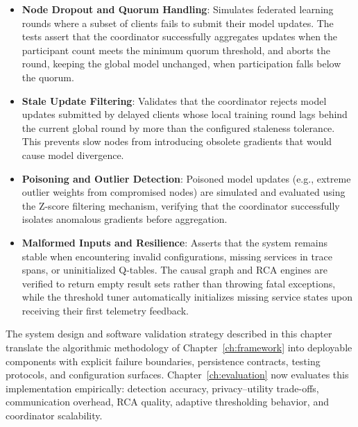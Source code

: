 \begin{itemize}
    \item \textbf{Node Dropout and Quorum Handling}: Simulates federated learning rounds where a subset of clients fails to submit their model updates. The tests assert that the coordinator successfully aggregates updates when the participant count meets the minimum quorum threshold, and aborts the round, keeping the global model unchanged, when participation falls below the quorum.
    \item \textbf{Stale Update Filtering}: Validates that the coordinator rejects model updates submitted by delayed clients whose local training round lags behind the current global round by more than the configured staleness tolerance. This prevents slow nodes from introducing obsolete gradients that would cause model divergence.
    \item \textbf{Poisoning and Outlier Detection}: Poisoned model updates (e.g., extreme outlier weights from compromised nodes) are simulated and evaluated using the Z-score filtering mechanism, verifying that the coordinator successfully isolates anomalous gradients before aggregation.
    \item \textbf{Malformed Inputs and Resilience}: Asserts that the system remains stable when encountering invalid configurations, missing services in trace spans, or uninitialized Q-tables. The causal graph and RCA engines are verified to return empty result sets rather than throwing fatal exceptions, while the threshold tuner automatically initializes missing service states upon receiving their first telemetry feedback.
\end{itemize}

The system design and software validation strategy described in this chapter translate the algorithmic methodology of Chapter~\ref{ch:framework} into deployable components with explicit failure boundaries, persistence contracts, testing protocols, and configuration surfaces. Chapter~\ref{ch:evaluation} now evaluates this implementation empirically: detection accuracy, privacy--utility trade-offs, communication overhead, RCA quality, adaptive thresholding behavior, and coordinator scalability.
